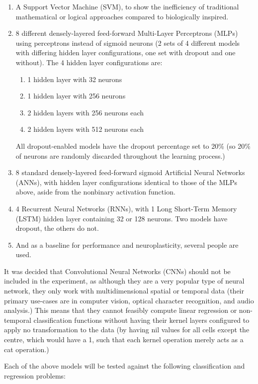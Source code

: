 \documentclass[]{report}
\begin{document}
\begin{enumerate}
	\item A Support Vector Machine (SVM), to show the inefficiency of traditional mathematical or logical approaches compared to biologically inspired.
	\item 8 different densely-layered feed-forward Multi-Layer Perceptrons (MLPs) using perceptrons instead of sigmoid neurons (2 sets of 4 different models with differing hidden layer configurations, one set with dropout and one without).
	\newline
	The 4 hidden layer configurations are:
	\begin{enumerate}
		\item 1 hidden layer with 32 neurons
		\item 1 hidden layer with 256 neurons
		\item 2 hidden layers with 256 neurons each
		\item 2 hidden layers with 512 neurons each
	\end{enumerate}
	All dropout-enabled models have the dropout percentage set to 20\% (so 20\% of neurons are randomly discarded throughout the learning process.)
	\item 8 standard densely-layered feed-forward sigmoid Artificial Neural Networks (ANNs), with hidden layer configurations identical to those of the MLPs above, aside from the nonbinary activation function.
	\item 4 Recurrent Neural Networks (RNNs), with 1 Long Short-Term Memory (LSTM) hidden layer containing 32 or 128 neurons. Two models have dropout, the others do not.
	\item And as a baseline for performance and neuroplasticity, several people are used.
\end{enumerate}

It was decided that Convolutional Neural Networks (CNNs) should not be included in the experiment, as although they are a very popular type of neural network, they only work with multidimensional spatial or temporal data (their primary use-cases are in computer vision, optical character recognition, and audio analysis.) This means that they cannot feasibly compute linear regression or non-temporal classification functions without having their kernel layers configured to apply no transformation to the data (by having nil values for all cells except the centre, which would have a 1, such that each kernel operation merely acts as a cat operation.)

Each of the above models will be tested against the following classification and regression problems:
\end{document}

